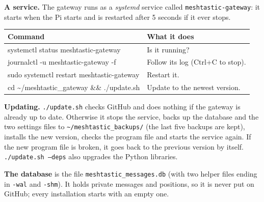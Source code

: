 \documentclass[10pt,a4paper]{article}
\newcommand{\lead}[1]{\textbf{#1}\enspace}           %
\newcommand{\cmd}[1]{\texttt{#1}}
\begin{document}
\lead{A service.} The gateway runs as a \emph{systemd} service called \cmd{meshtastic-gateway}: it starts when the Pi starts and is restarted after 5 seconds if it ever stops.

\begin{center}
\begin{tabularx}{\textwidth}{@{}>{\ttfamily\small}lX@{}}
\toprule
\normalfont Command & What it does \\
\midrule
systemctl status meshtastic-gateway & Is it running? \\
journalctl -u meshtastic-gateway -f & Follow its log (Ctrl+C to stop). \\
sudo systemctl restart meshtastic-gateway & Restart it. \\
cd \textasciitilde/meshtastic\_gateway \&\& ./update.sh & Update to the newest version. \\
\bottomrule
\end{tabularx}
\end{center}

\lead{Updating.} \cmd{./update.sh} checks GitHub and does nothing if the gateway is already up to date. Otherwise it stops the service, backs up the database and the two settings files to \cmd{\textasciitilde/meshtastic\_backups/} (the last five backups are kept), installs the new version, checks the program file and starts the service again. If the new program file is broken, it goes back to the previous version by itself. \cmd{./update.sh --deps} also upgrades the Python libraries.

\lead{The database} is the file \cmd{meshtastic\_messages.db} (with two helper files ending in \cmd{-wal} and \cmd{-shm}). It holds private messages and positions, so it is never put on GitHub; every installation starts with an empty one.
\end{document}
